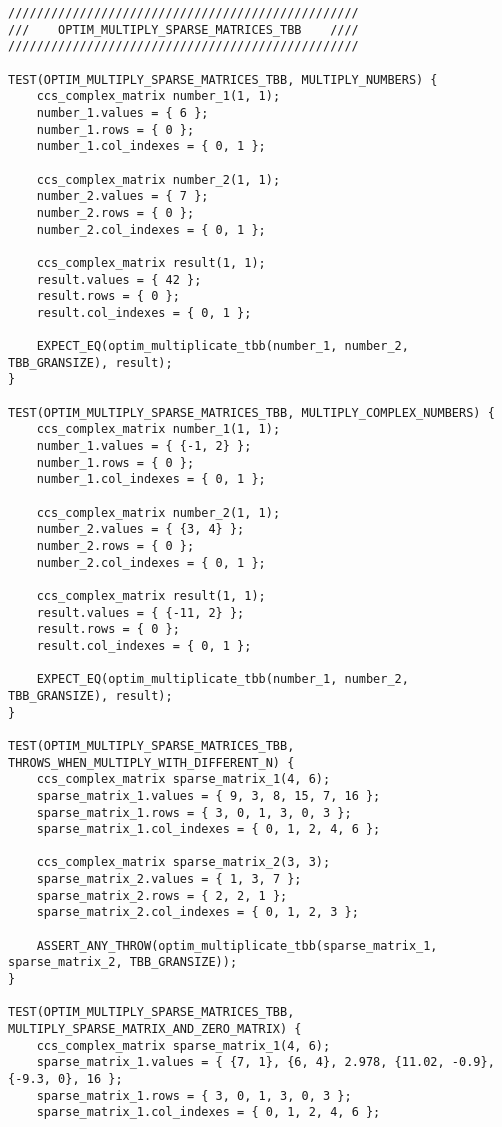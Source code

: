 \documentclass{report}
\begin{document}
\begin{lstlisting}
/////////////////////////////////////////////////
///    OPTIM_MULTIPLY_SPARSE_MATRICES_TBB    ////
/////////////////////////////////////////////////

TEST(OPTIM_MULTIPLY_SPARSE_MATRICES_TBB, MULTIPLY_NUMBERS) {
    ccs_complex_matrix number_1(1, 1);
    number_1.values = { 6 };
    number_1.rows = { 0 };
    number_1.col_indexes = { 0, 1 };

    ccs_complex_matrix number_2(1, 1);
    number_2.values = { 7 };
    number_2.rows = { 0 };
    number_2.col_indexes = { 0, 1 };

    ccs_complex_matrix result(1, 1);
    result.values = { 42 };
    result.rows = { 0 };
    result.col_indexes = { 0, 1 };

    EXPECT_EQ(optim_multiplicate_tbb(number_1, number_2, TBB_GRANSIZE), result);
}

TEST(OPTIM_MULTIPLY_SPARSE_MATRICES_TBB, MULTIPLY_COMPLEX_NUMBERS) {
    ccs_complex_matrix number_1(1, 1);
    number_1.values = { {-1, 2} };
    number_1.rows = { 0 };
    number_1.col_indexes = { 0, 1 };

    ccs_complex_matrix number_2(1, 1);
    number_2.values = { {3, 4} };
    number_2.rows = { 0 };
    number_2.col_indexes = { 0, 1 };

    ccs_complex_matrix result(1, 1);
    result.values = { {-11, 2} };
    result.rows = { 0 };
    result.col_indexes = { 0, 1 };

    EXPECT_EQ(optim_multiplicate_tbb(number_1, number_2, TBB_GRANSIZE), result);
}

TEST(OPTIM_MULTIPLY_SPARSE_MATRICES_TBB, THROWS_WHEN_MULTIPLY_WITH_DIFFERENT_N) {
    ccs_complex_matrix sparse_matrix_1(4, 6);
    sparse_matrix_1.values = { 9, 3, 8, 15, 7, 16 };
    sparse_matrix_1.rows = { 3, 0, 1, 3, 0, 3 };
    sparse_matrix_1.col_indexes = { 0, 1, 2, 4, 6 };

    ccs_complex_matrix sparse_matrix_2(3, 3);
    sparse_matrix_2.values = { 1, 3, 7 };
    sparse_matrix_2.rows = { 2, 2, 1 };
    sparse_matrix_2.col_indexes = { 0, 1, 2, 3 };

    ASSERT_ANY_THROW(optim_multiplicate_tbb(sparse_matrix_1, sparse_matrix_2, TBB_GRANSIZE));
}

TEST(OPTIM_MULTIPLY_SPARSE_MATRICES_TBB, MULTIPLY_SPARSE_MATRIX_AND_ZERO_MATRIX) {
    ccs_complex_matrix sparse_matrix_1(4, 6);
    sparse_matrix_1.values = { {7, 1}, {6, 4}, 2.978, {11.02, -0.9}, {-9.3, 0}, 16 };
    sparse_matrix_1.rows = { 3, 0, 1, 3, 0, 3 };
    sparse_matrix_1.col_indexes = { 0, 1, 2, 4, 6 };


\end{lstlisting}
\end{document}
